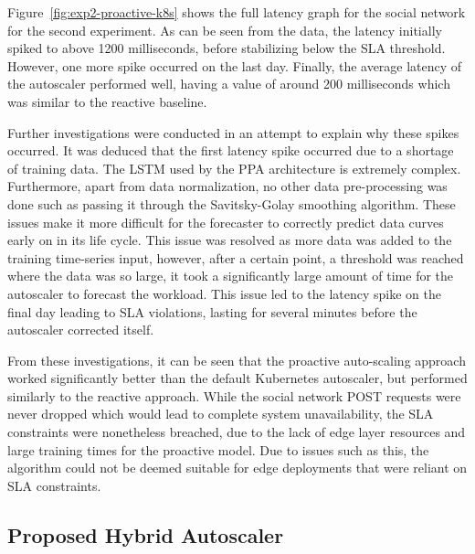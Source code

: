 Figure~\ref{fig:exp2-proactive-k8s} shows the full latency graph for the social network for the second experiment. As can be seen from the data, the latency initially spiked to above 1200 milliseconds, before stabilizing below the SLA threshold. However, one more spike occurred on the last day. Finally, the average latency of the autoscaler performed well, having a value of around 200 milliseconds which was similar to the reactive baseline.\par

Further investigations were conducted in an attempt to explain why these spikes occurred. It was deduced that the first latency spike occurred due to a shortage of training data. The LSTM used by the PPA architecture is extremely complex. Furthermore, apart from data normalization, no other data pre-processing was done such as passing it through the Savitsky-Golay smoothing algorithm. These issues make it more difficult for the forecaster to correctly predict data curves early on in its life cycle. This issue was resolved as more data was added to the training time-series input, however, after a certain point, a threshold was reached where the data was so large, it took a significantly large amount of time for the autoscaler to forecast the workload. This issue led to the latency spike on the final day leading to SLA violations, lasting for several minutes before the autoscaler corrected itself.\par

From these investigations, it can be seen that the proactive auto-scaling approach worked significantly better than the default Kubernetes autoscaler, but performed similarly to the reactive approach. While the social network POST requests were never dropped which would lead to complete system unavailability, the SLA constraints were nonetheless breached, due to the lack of edge layer resources and large training times for the proactive model. Due to issues such as this, the algorithm could not be deemed suitable for edge deployments that were reliant on SLA constraints.\par

\subsection {Proposed Hybrid Autoscaler}
\label{subsec:ch6-hybrid-algo}

